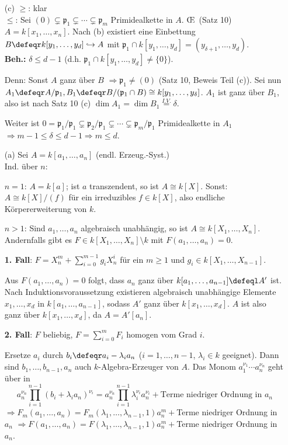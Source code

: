 \begin{Bew}
\begin{enumerate}
\item[(c)] \glqq$\geq$\grqq: klar\\
\glqq$\leq$\grqq: Sei $(0)\subsetneq \mathfrak{p}_1\subsetneq \cdots\subsetneq \mathfrak{p}_m$ Primidealkette
in $A$. \OE\ (Satz 10) $A=k[x_1,\ldots, x_n]$. Nach (b) existiert eine Einbettung 
$B\defeqr k[y_1,\ldots,y_d]\hookrightarrow A$ mit $\mathfrak{p}_1\cap k[y_1,\ldots, y_d]
=(y_{\delta+1},\ldots, y_d)$.\\
\textbf{Beh.:} $\delta\leq d-1$ (d.h. $\mathfrak{p}_1\cap k[y_1,\ldots,y_d]\neq \{0\}$).

Denn: Sonst $A$ ganz \"uber $B$ $\Rightarrow \mathfrak{p}_1\not=(0)$ (Satz 10, Beweis Teil (c)).
Sei nun $A_1\defeqr A/\mathfrak{p}_1, B_1\defeqr B/(\mathfrak{p}_1\cap B)
\cong k[y_1,\ldots, y_\delta]$. $A_1$ ist ganz \"uber $B_1$, also ist nach Satz 10 (c)
$\dim{A_1}=\dim{B_1} \stackrel{I.V.}{=}\delta$.

Weiter ist $0=\mathfrak{p}_1/\mathfrak{p}_1\subsetneq \mathfrak{p}_2/\mathfrak{p}_1
\subsetneq \cdots \subsetneq \mathfrak{p}_m/\mathfrak{p}_1$ Primidealkette in $A_1$
$\Rightarrow m-1\leq \delta \leq d-1 \Rightarrow m\leq d$.

\item[(a)] Sei $A=k[a_1,\ldots, a_n]$  (endl. Erzeug.-Syst.)\\
Ind. \"uber $n$: 

$n=1$: $A=k[a]$; ist $a$ transzendent, so ist $A\cong k[X]$. Sonst: $A\cong k[X]/(f)$
f\"ur ein irreduzibles $f\in k[X]$, also endliche K\"orpererweiterung von $k$.

$n> 1$: Sind $a_1,\ldots, a_n$ algebraisch unabh\"angig, so ist $A\cong k[X_1,\ldots, X_n]$.
Andernfalls gibt es $F\in k[X_1, \ldots, X_n]\setminus k$ mit $F(a_1, \ldots,
a_n)=0$.

\textbf{1. Fall}: $F=X_n^m+\sum_{i=0}^{m-1}g_i X_n^i$ f\"ur ein $m\geq 1$ und
$g_i\in k[X_1,\ldots, X_{n-1}]$.

Aus $F(a_1, \ldots, a_n)=0$ folgt, dass $a_n$ ganz \"uber $k[a_1, \ldots,
a_{n-1}]\defeql A'$ ist.
Nach Induktionsvoraussetzung existieren algebraisch unabh\"angige Elemente 
$x_1,\ldots,x_d$ in
$k[a_1,\ldots, a_{n-1}]$, sodass $A'$ ganz \"uber $k[x_1,\ldots,x_d]$. $A$ ist also ganz
\"uber $k[x_1, \ldots, x_d]$, da $A=A'[a_n]$.

\textbf{2. Fall}: $F$ beliebig, $F=\sum_{i=0}^{m}F_i$ homogen vom Grad $i$. 

Ersetze $a_i$ durch $b_i\defeqr a_i-\lambda_i a_n$ ($i=1,\ldots, n-1$, $\lambda_i\in k$
\glqq geeignet\grqq). Dann sind $b_1,\ldots, b_{n-1},a_n$ auch $k$-Algebra-Erzeuger
von $A$. Das Monom $a_1^{\nu_1}\cdots a_n^{\nu_n}$ geht \"uber in 
\[
a_n^{\nu_n}\prod_{i=1}^{n-1}(b_i+\lambda_i a_n)^{\nu_i}
=a_n^{\nu_n}\prod_{i=1}^{n-1} \lambda_i^{\nu_i} a_n^{\nu_i}+
\text{Terme niedriger Ordnung in } a_n
\]
$\Rightarrow F_m(a_1,\ldots,
a_n)=F_m(\lambda_1,\ldots,\lambda_{n-1},1)a_n^m+$Terme niedriger Ordnung in 
$a_n$ $\Rightarrow F(a_1,\ldots,
a_n)=F(\lambda_1,\ldots,\lambda_{n-1},1)a_n^m+$Terme niedriger Ordnung in $a_n$.


\end{enumerate}
\end{Bew}
